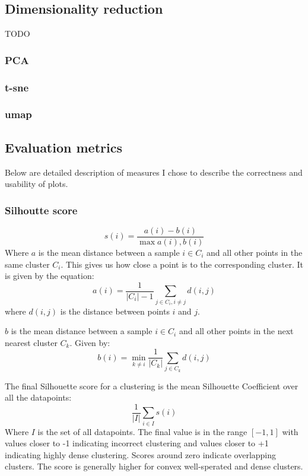 \documentclass[11pt]{article}
\begin{document}
\subsection{Dimensionality reduction}
\label{sec:orgb502774}
TODO
\subsubsection{PCA}
\label{sec:org93f3c9b}
\subsubsection{t-sne}
\label{sec:orgadaa38f}
\subsubsection{umap}
\label{sec:org6a758a8}

\subsection{Evaluation metrics}
\label{sec:org078e27c}

Below are detailed description of measures I chose to describe the correctness and usability of plots.
\subsubsection{Silhoutte score}
\label{sec:org8d91088}


\[s(i) = \frac{a(i) - b(i)}{\max{a(i), b(i)}} \]
Where \(a\) is the mean distance between a sample \(i \in C_{i}\) and all other points in the same cluster \(C_{i}\). This gives us how close a point is to the corresponding cluster. It is given by the equation:
\[ a(i) = \frac{1}{|C_{i}| - 1} \sum_{j \in C_{i}, i \neq j}{d(i,j)}\]
where \(d(i,j)\) is the distance between points \(i\) and \(j\).

\(b\) is the mean distance between a sample \(i \in C_{i}\) and all other points in the next nearest cluster \(C_{k}\). Given by:
\[ b(i) = \min_{k \neq i}{\frac{1}{|C_{k}|} \sum_{j \in C_{k}}{d(i,j)}} \]

The final Silhouette score for a clustering is the mean Silhouette Coefficient over all the datapoints:
\[ \frac{1}{|I|}\sum_{i \in I}{s(i)} \]
Where \(I\) is the set of all datapoints. The final value is in the range \([-1, 1]\) with values closer to -1 indicating incorrect clustering and values closer to +1 indicating highly dense clustering. Scores around zero indicate overlapping clusters. The score is generally higher for convex well-sperated and dense clusters.
\end{document}
